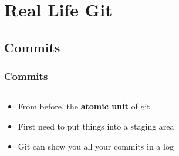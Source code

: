 \documentclass{beamer}
\begin{document}
\begin{frame}
\end{frame}

\section{Real Life Git}

\subsection{Commits}
\begin{frame}
    \frametitle{Commits}

    \begin{columns}
        \begin{column}{0.5\textwidth}
            \begin{itemize}[<+->]
                \item From before, the \textbf{atomic unit} of git
                \item First need to put things into a staging area
                \item Git can show you all your commits in a log
            \end{itemize}
        \end{column}
        \begin{column}{0.5\textwidth}
        \end{column}
    \end{columns}
\end{frame}
\end{document}
